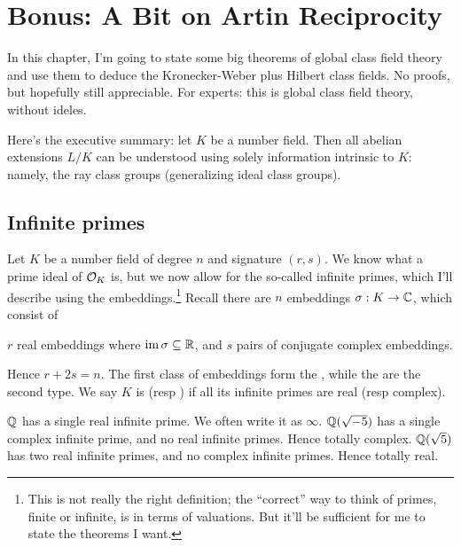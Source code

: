 \chapter{Bonus: A Bit on Artin Reciprocity}
In this chapter, I'm going to state some big theorems of
global class field theory and use them to deduce the
Kronecker-Weber plus Hilbert class fields.
No proofs, but hopefully still appreciable.
For experts: this is global class field theory, without ideles.

Here's the executive summary: let $K$ be a number field.
Then all abelian extensions $L/K$ can be understood
using solely information intrinsic to $K$:
namely, the ray class groups (generalizing ideal class groups).

\section{Infinite primes}
Let $K$ be a number field of degree $n$ and signature $(r,s)$.
We know what a prime ideal of $\mathcal O_K$ is,
but we now allow for the so-called infinite primes,
which I'll describe using the embeddings.\footnote{This is
	not really the right definition; the ``correct'' way to think of
	primes, finite or infinite, is in terms of valuations.
	But it'll be sufficient for me to state the theorems I want.}
Recall there are $n$ embeddings $\sigma : K \to \mathbb C$, which consist of
\begin{itemize}
	\ii $r$ real embeddings where $\operatorname{im}\sigma \subseteq \mathbb R$, and
	\ii $s$ pairs of conjugate complex embeddings.
\end{itemize}
Hence $r+2s = n$.
The first class of embeddings form the ,
while the  are the second type.
We say $K$ is  (resp )
if all its infinite primes are real (resp complex).
\begin{example}
	\listhack
	\begin{itemize}
		\ii $\mathbb Q$ has a single real infinite prime.
		We often write it as $\infty$.
		\ii $\mathbb Q(\sqrt{-5})$ has a single complex infinite prime,
		and no real infinite primes. Hence totally complex.
		\ii $\mathbb Q(\sqrt{5})$ has two real infinite primes,
		and no complex infinite primes. Hence totally real.
	\end{itemize}
\end{example}

